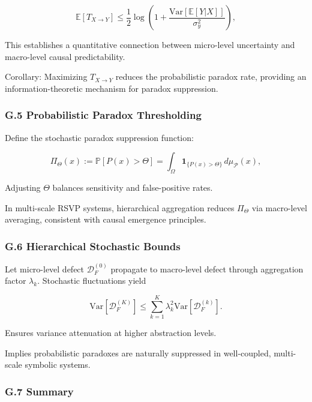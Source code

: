 \documentclass[12pt]{article}
\theoremstyle{plain}
\begin{document}
\begin{equation}
\mathbb{E}[T_{X \to Y}] \le \frac{1}{2} \log \left( 1 + \frac{\mathrm{Var}[\mathbb{E}[Y|X]]}{\sigma_y^2} \right),
\end{equation}

This establishes a quantitative connection between micro-level uncertainty and macro-level causal predictability.

Corollary:
Maximizing \(T_{X \to Y}\) reduces the probabilistic paradox rate, providing an information-theoretic mechanism for paradox suppression.

\subsubsection*{G.5 Probabilistic Paradox Thresholding}

Define the stochastic paradox suppression function:

\begin{equation}
\Pi_\Theta(x) := \mathbb{P}[P(x) > \Theta] = \int_\Omega \mathbf{1}_{\{P(x)>\Theta\}} \, d\mu_\mathcal{P}(x),
\end{equation}

Adjusting \(\Theta\) balances sensitivity and false-positive rates.

In multi-scale RSVP systems, hierarchical aggregation reduces \(\Pi_\Theta\) via macro-level averaging, consistent with causal emergence principles.

\subsubsection*{G.6 Hierarchical Stochastic Bounds}

Let micro-level defect \(\mathcal{D}_F^{(0)}\) propagate to macro-level defect through aggregation factor \(\lambda_k\). Stochastic fluctuations yield

\begin{equation}
\mathrm{Var}[\mathcal{D}_F^{(K)}] \le \sum_{k=1}^K \lambda_k^2 \mathrm{Var}[\mathcal{D}_F^{(k)}].
\end{equation}

Ensures variance attenuation at higher abstraction levels.

Implies probabilistic paradoxes are naturally suppressed in well-coupled, multi-scale symbolic systems.

\subsubsection*{G.7 Summary}
\end{document}
